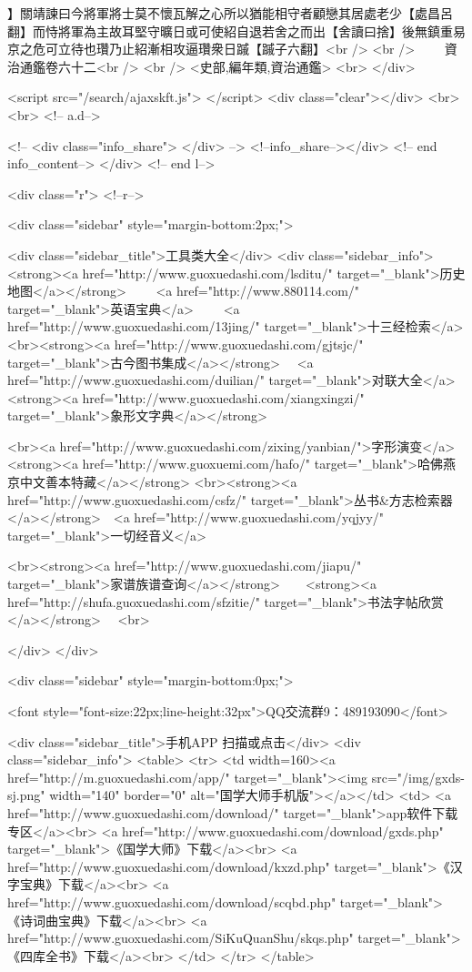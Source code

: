 】關靖諫曰今將軍將士莫不懷瓦解之心所以猶能相守者顧戀其居處老少【處昌呂翻】而恃將軍為主故耳堅守曠日或可使紹自退若舍之而出【舍讀曰捨】後無鎮重易京之危可立待也瓚乃止紹漸相攻逼瓚衆日䠞【䠞子六翻】<br />
<br />
　　資治通鑑卷六十二<br />
<br />
<史部,編年類,資治通鑑>  <br>
   </div> 

<script src="/search/ajaxskft.js"> </script>
 <div class="clear"></div>
<br>
<br>
 <!-- a.d-->

 <!--
<div class="info_share">
</div> 
-->
 <!--info_share--></div>   <!-- end info_content-->
  </div> <!-- end l-->

<div class="r">   <!--r-->



<div class="sidebar"  style="margin-bottom:2px;">

 
<div class="sidebar_title">工具类大全</div>
<div class="sidebar_info">
<strong><a href="http://www.guoxuedashi.com/lsditu/" target="_blank">历史地图</a></strong>　　
<a href="http://www.880114.com/" target="_blank">英语宝典</a>　　
<a href="http://www.guoxuedashi.com/13jing/" target="_blank">十三经检索</a>　
<br><strong><a href="http://www.guoxuedashi.com/gjtsjc/" target="_blank">古今图书集成</a></strong>　
<a href="http://www.guoxuedashi.com/duilian/" target="_blank">对联大全</a>　<strong><a href="http://www.guoxuedashi.com/xiangxingzi/" target="_blank">象形文字典</a></strong>　

<br><a href="http://www.guoxuedashi.com/zixing/yanbian/">字形演变</a>　　<strong><a href="http://www.guoxuemi.com/hafo/" target="_blank">哈佛燕京中文善本特藏</a></strong>
<br><strong><a href="http://www.guoxuedashi.com/csfz/" target="_blank">丛书&方志检索器</a></strong>　<a href="http://www.guoxuedashi.com/yqjyy/" target="_blank">一切经音义</a>　　

<br><strong><a href="http://www.guoxuedashi.com/jiapu/" target="_blank">家谱族谱查询</a></strong>　　<strong><a href="http://shufa.guoxuedashi.com/sfzitie/" target="_blank">书法字帖欣赏</a></strong>　
<br>

</div>
</div>


<div class="sidebar" style="margin-bottom:0px;">

<font style="font-size:22px;line-height:32px">QQ交流群9：489193090</font>


<div class="sidebar_title">手机APP 扫描或点击</div>
<div class="sidebar_info">
<table>
<tr>
	<td width=160><a href="http://m.guoxuedashi.com/app/" target="_blank"><img src="/img/gxds-sj.png" width="140"  border="0" alt="国学大师手机版"></a></td>
	<td>
<a href="http://www.guoxuedashi.com/download/" target="_blank">app软件下载专区</a><br>
<a href="http://www.guoxuedashi.com/download/gxds.php" target="_blank">《国学大师》下载</a><br>
<a href="http://www.guoxuedashi.com/download/kxzd.php" target="_blank">《汉字宝典》下载</a><br>
<a href="http://www.guoxuedashi.com/download/scqbd.php" target="_blank">《诗词曲宝典》下载</a><br>
<a href="http://www.guoxuedashi.com/SiKuQuanShu/skqs.php" target="_blank">《四库全书》下载</a><br>
</td>
</tr>
</table>

